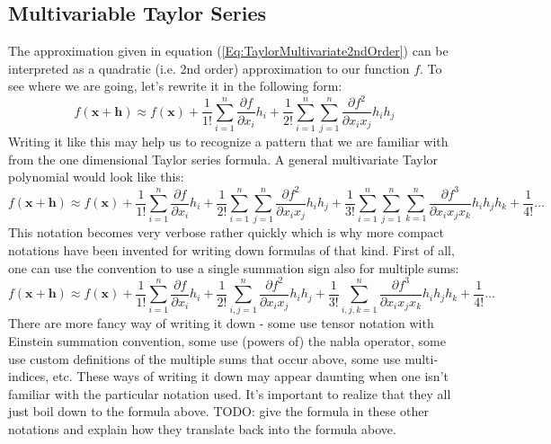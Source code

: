 \subsection{Multivariable Taylor Series} 
The approximation given in equation (\ref{Eq:TaylorMultivariate2ndOrder}) can be interpreted as a quadratic (i.e. 2nd order) approximation to our function $f$. To see where we are going, let's rewrite it in the following form:
\begin{equation}
 f(\mathbf{x + h}) \approx
 f(\mathbf{x}) + 
 \frac{1}{1!} \sum_{i=1}^{n} \frac{\partial f}{\partial x_i} h_i + 
 \frac{1}{2!} \sum_{i=1}^{n} \sum_{j=1}^{n}  \frac{\partial f^2}{\partial x_i x_j} h_i h_j
\end{equation}
Writing it like this may help us to recognize a pattern that we are familiar with from the one dimensional Taylor series formula. A general multivariate Taylor polynomial would look like this:
\begin{equation}
 f(\mathbf{x + h}) \approx
 f(\mathbf{x}) + 
 \frac{1}{1!} \sum_{i=1}^{n} \frac{\partial f}{\partial x_i} h_i + 
 \frac{1}{2!} \sum_{i=1}^{n} \sum_{j=1}^{n}  \frac{\partial f^2}{\partial x_i x_j} h_i h_j +
 \frac{1}{3!} \sum_{i=1}^{n} \sum_{j=1}^{n}  \sum_{k=1}^{n} 
              \frac{\partial f^3}{\partial x_i x_j x_k} h_i h_j h_k + 
 \frac{1}{4!}  \ldots              
\end{equation}
This notation becomes very verbose rather quickly which is why more compact notations have been invented for writing down formulas of that kind. First of all, one can use the convention to use a single summation sign also for multiple sums:
\begin{equation}
 f(\mathbf{x + h}) \approx
 f(\mathbf{x}) + 
 \frac{1}{1!} \sum_{i=1}^{n}     \frac{\partial f}{\partial x_i} h_i + 
 \frac{1}{2!} \sum_{i,j=1}^{n}   \frac{\partial f^2}{\partial x_i x_j} h_i h_j +
 \frac{1}{3!} \sum_{i,j,k=1}^{n} \frac{\partial f^3}{\partial x_i x_j x_k} h_i h_j h_k + 
 \frac{1}{4!}  \ldots              
\end{equation}
There are more fancy way of writing it down - some use tensor notation with Einstein summation convention, some use (powers of) the nabla operator, some use custom definitions of the multiple sums that occur above, some use multi-indices, etc. These ways of writing it down may appear daunting when one isn't familiar with the particular notation used. It's important to realize that they all just boil down to the formula above. TODO: give the formula in these other notations and explain how they translate back into the formula above.

